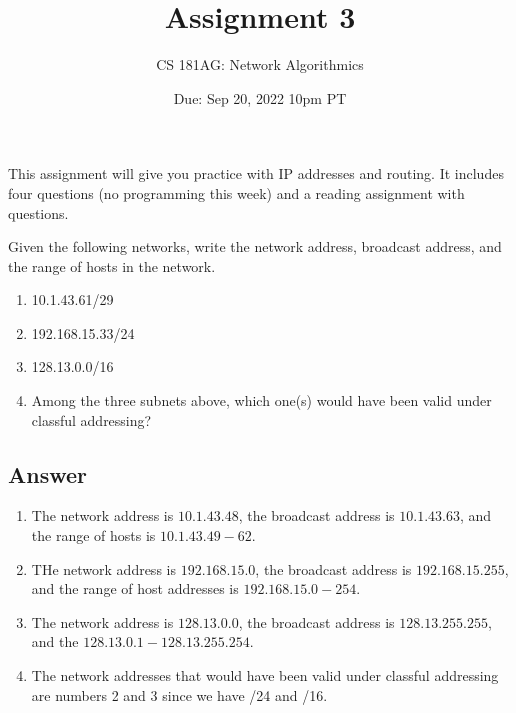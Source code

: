\documentclass[10pt]{article}
\date{Due: Sep 20, 2022 10pm PT}
\newenvironment{problem}[2][Problem]{\begin{trivlist}
\item[\hskip \labelsep {\bfseries #1}\hskip \labelsep {\bfseries #2.}]}{\end{trivlist}}
\begin{document}
 
\title{Assignment 3}
\author{
CS 181AG: Network Algorithmics}
\maketitle

This assignment will give you practice with IP addresses and routing. It includes four questions (no programming this week) and a reading assignment with questions.  

\begin{problem} {1: IP Addresses}
Given the following networks, write the network address, broadcast
address, and the range of hosts in the network.

\begin{enumerate}
    \item 10.1.43.61/29
    \item 192.168.15.33/24
    \item 128.13.0.0/16
    \item Among the three subnets above, which one(s) would have been valid under classful addressing?
    
\end{enumerate}
\subsection*{Answer}
\begin{enumerate}
    \item The network address is $10.1.43.48$, the broadcast address is $10.1.43.63$, and the range of hosts is $10.1.43.49-62$.
    \item THe network address is $192.168.15.0$, the broadcast address is $192.168.15.255$, and the range of host addresses is $ 192.168.15.0-254$.
    \item The network address is $128.13.0.0$, the broadcast address is $128.13.255.255$, and the $128.13.0.1-128.13.255.254$.
    \item The network addresses that would have been valid under classful addressing are numbers 2 and 3 since we have /24 and /16.
\end{enumerate}
\end{problem}
\end{document}
